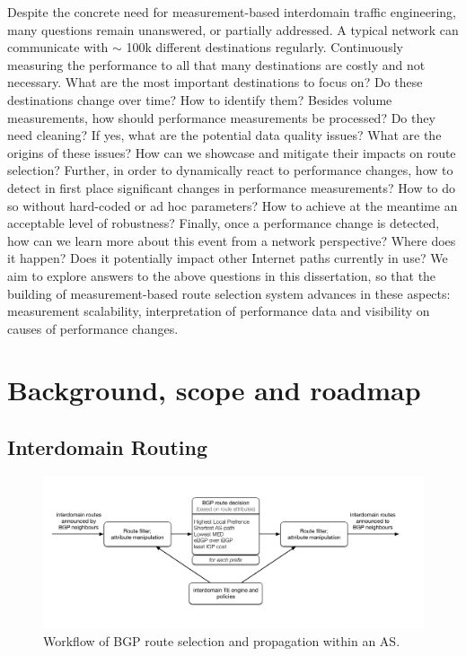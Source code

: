 Despite the concrete need for measurement-based interdomain traffic engineering, many questions remain unanswered, or partially addressed.
A typical network can communicate with $\sim$ 100k different destinations regularly. 
Continuously measuring the performance to all that many destinations are costly and not necessary. 
What are the most important destinations to focus on? Do these destinations change over time? How to identify them?
Besides volume measurements, how should performance measurements be processed? Do they need cleaning?
If yes, what are the potential data quality issues? What are the origins of these issues? How can we showcase and mitigate their impacts on route selection?
Further, in order to dynamically react to performance changes, how to detect in first place significant changes in performance measurements? How to do so without hard-coded or ad hoc parameters? How to achieve at the meantime an acceptable level of robustness?
Finally, once a performance change is detected, how can we learn more about this event from a network perspective? Where does it happen? Does it potentially impact other Internet paths currently in use? 
We aim to explore answers to the above questions in this dissertation, so that the building of measurement-based route selection system advances in these aspects: measurement scalability, interpretation of performance data and visibility on causes of performance changes. 

\chapter{Background, scope and roadmap}
\section{Interdomain Routing}
\begin{figure}[!htb]
\centering
\includegraphics[width=1.3\textwidth]{gfx/chap1/bgp_decision.pdf}
\caption{Workflow of \acf{BGP} route selection and propagation within an \acf{AS}.}
\label{fig:bgp_decision}
\end{figure}

